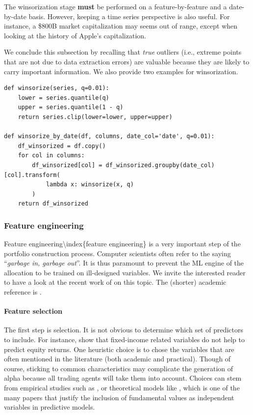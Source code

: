 The winsorization stage \textbf{must} be performed on a feature-by-feature and a date-by-date basis. However, keeping a time series perspective is also useful. For instance, a \$800B market capitalization may seems out of range, except when looking at the history of Apple's capitalization.

We conclude this subsection by recalling that \textit{true} outliers (i.e., extreme points that are not due to data extraction errors) are valuable because they are likely to carry important information. We also provide two examples for winsorization.

\begin{verbatim}
def winsorize(series, q=0.01):
    lower = series.quantile(q)
    upper = series.quantile(1 - q)
    return series.clip(lower=lower, upper=upper)

def winsorize_by_date(df, columns, date_col='date', q=0.01):
    df_winsorized = df.copy()
    for col in columns:
        df_winsorized[col] = df_winsorized.groupby(date_col)[col].transform(
            lambda x: winsorize(x, q)
        )
    return df_winsorized
\end{verbatim}

\subsubsection{Feature engineering}\label{feateng}

Feature engineering{\textbackslash}index\{feature engineering\} is a very important step of the portfolio construction process. Computer scientists often refer to the saying ``\textit{garbage in, garbage out}''. It is thus paramount to prevent the ML engine of the allocation to be trained on ill-designed variables.
We invite the interested reader to have a look at the recent work of \cite{kuhn2019feature} on this topic. The (shorter) academic reference is \cite{guyon2003introduction}.

\paragraph{Feature selection}

The first step is selection. It is not obvious to determine which set of predictors to include. For instance, \cite{bali2020cross} show that fixed-income related variables do not help to predict equity returns. One heuristic choice is to chose the variables that are often mentioned in the literature (both academic and practical). Though of course, sticking to common characteristics may complicate the generation of alpha because all trading agents will take them into account. Choices can stem from empirical studies such as \cite{chen2021open}, or theoretical models like \cite{ohlson1995earnings}, which is one of the many papers that justify the inclusion of fundamental values as independent variables in predictive models.

